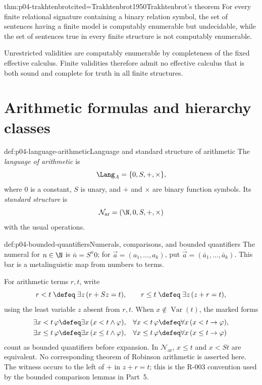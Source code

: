 \begin{hbtheorem}{thm:p04-trakhtenbrot}{cited=Trakhtenbrot1950}{Trakhtenbrot's theorem}
For every finite relational signature containing a binary relation symbol, the
set of sentences having a finite model is computably enumerable but
undecidable, while the set of sentences true in every finite structure is not
computably enumerable.
\end{hbtheorem}

Unrestricted validities are computably enumerable by completeness of the fixed
effective calculus.  Finite validities therefore admit no effective calculus
that is both sound and complete for truth in all finite structures.

\section{Arithmetic formulas and hierarchy classes}
\label{sec:p04-arithmetic-hierarchy-syntax}

\begin{hbdefinition}{def:p04-language-arithmetic}{Language and standard structure of arithmetic}
The \emph{language of arithmetic} is
\[
 \Lang_A=\{0,S,+,\times\},
\]
where \(0\) is a constant, \(S\) is unary, and \(+\) and \(\times\) are
binary function symbols.  Its \emph{standard structure} is
\[
 \mathcal N_{\mathrm{ar}}=(\N,0,S,+,\times)
\]
with the usual operations.
\end{hbdefinition}

\begin{hbconvention}{def:p04-bounded-quantifiers}{Numerals, comparisons, and bounded quantifiers}
The numeral for \(n\in\N\) is \(\bar n=S^n0\); for
\(\vec a=(a_1,\ldots,a_k)\), put
\(\overline{\vec a}=(\bar a_1,\ldots,\bar a_k)\).  This bar is a
metalinguistic map from numbers to terms.

For arithmetic terms \(r,t\), write
\[
 r<t\;\defeq\;\exists z\,(r+Sz=t),
 \qquad
 r\leq t\;\defeq\;\exists z\,(z+r=t),
\]
using the least variable \(z\) absent from \(r,t\).  When
\(x\notin\operatorname{Var}(t)\), the marked forms
\[
\begin{aligned}
 \exists x<t\,\varphi&\defeq\exists x\,(x<t\land\varphi),&
 \forall x<t\,\varphi&\defeq\forall x\,(x<t\to\varphi),\\
 \exists x\leq t\,\varphi&\defeq\exists x\,(x\leq t\land\varphi),&
 \forall x\leq t\,\varphi&\defeq\forall x\,(x\leq t\to\varphi)
\end{aligned}
\]
count as bounded quantifiers before expansion.  In \(\mathcal N_{\mathrm{ar}}\),
\(x\leq t\) and \(x<St\) are equivalent.  No corresponding theorem of
Robinson arithmetic is asserted here.  The witness occurs to the left of
\(+\) in \(z+r=t\); this is the R-003 convention used by the bounded
comparison lemmas in Part~5.
\end{hbconvention}

